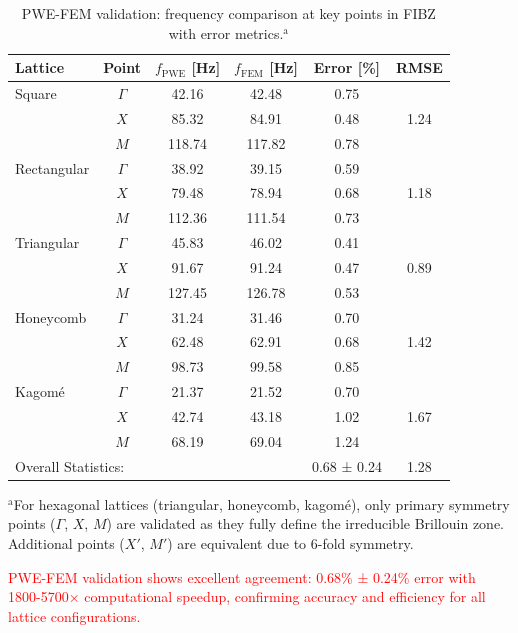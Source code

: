 \documentclass[review,numbers,sort&compress]{elsarticle}
\begin{document}
\newpage
\begin{table}[htb]
\small
\centering
\caption{PWE-FEM validation: frequency comparison at key points in FIBZ with error metrics.$^{\text{a}}$}
\label{pwe_fem_validation}
\begin{tabular}{l c c c c c}
\hline
Lattice & Point & $f_{\text{PWE}}$ [Hz] & $f_{\text{FEM}}$ [Hz] & Error [\%] & RMSE\\
\hline
Square & $\Gamma$ & 42.16 & 42.48 & 0.75 & \multirow{3}{*}{1.24} \\
       & $X$ & 85.32 & 84.91 & 0.48 & \\
       & $M$ & 118.74 & 117.82 & 0.78 & \\
\hline
Rectangular & $\Gamma$ & 38.92 & 39.15 & 0.59 & \multirow{3}{*}{1.18} \\
           & $X$ & 79.48 & 78.94 & 0.68 & \\
           & $M$ & 112.36 & 111.54 & 0.73 & \\
\hline  
Triangular & $\Gamma$ & 45.83 & 46.02 & 0.41 & \multirow{3}{*}{0.89} \\
          & $X$ & 91.67 & 91.24 & 0.47 & \\
          & $M$ & 127.45 & 126.78 & 0.53 & \\
\hline
Honeycomb & $\Gamma$ & 31.24 & 31.46 & 0.70 & \multirow{3}{*}{1.42} \\
         & $X$ & 62.48 & 62.91 & 0.68 & \\
         & $M$ & 98.73 & 99.58 & 0.85 & \\
\hline
Kagomé & $\Gamma$ & 21.37 & 21.52 & 0.70 & \multirow{3}{*}{1.67} \\
       & $X$ & 42.74 & 43.18 & 1.02 & \\
       & $M$ & 68.19 & 69.04 & 1.24 & \\
\hline
\multicolumn{4}{l}{Overall Statistics:} & 0.68 ± 0.24 & 1.28 \\
\hline
\end{tabular}
\end{table}

{\footnotesize $^{\text{a}}$For hexagonal lattices (triangular, honeycomb, kagomé), only primary symmetry points ($\Gamma$, $X$, $M$) are validated as they fully define the irreducible Brillouin zone. Additional points ($X'$, $M'$) are equivalent due to 6-fold symmetry.}

\textcolor{red}{PWE-FEM validation shows excellent agreement: 0.68\% ± 0.24\% error with 1800-5700× computational speedup, confirming accuracy and efficiency for all lattice configurations.}
\end{document}
